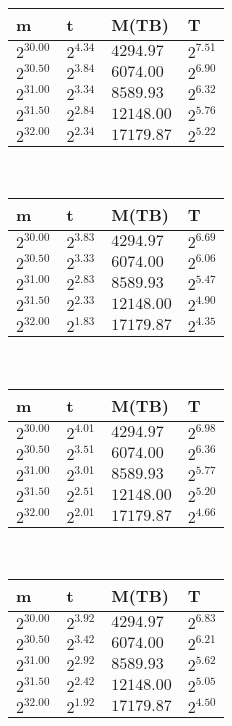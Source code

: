  \ 
\begin{tabular}{llll}
m & t & M(TB) & T \\ \hline
$2^{30.00}$ & $2^{4.34}$ & $4294.97$ & $2^{7.51}$ \\
$2^{30.50}$ & $2^{3.84}$ & $6074.00$ & $2^{6.90}$ \\
$2^{31.00}$ & $2^{3.34}$ & $8589.93$ & $2^{6.32}$ \\
$2^{31.50}$ & $2^{2.84}$ & $12148.00$ & $2^{5.76}$ \\
$2^{32.00}$ & $2^{2.34}$ & $17179.87$ & $2^{5.22}$ \\
\end{tabular}
 \ 
\begin{tabular}{llll}
m & t & M(TB) & T \\ \hline
$2^{30.00}$ & $2^{3.83}$ & $4294.97$ & $2^{6.69}$ \\
$2^{30.50}$ & $2^{3.33}$ & $6074.00$ & $2^{6.06}$ \\
$2^{31.00}$ & $2^{2.83}$ & $8589.93$ & $2^{5.47}$ \\
$2^{31.50}$ & $2^{2.33}$ & $12148.00$ & $2^{4.90}$ \\
$2^{32.00}$ & $2^{1.83}$ & $17179.87$ & $2^{4.35}$ \\
\end{tabular}
 \ 
\begin{tabular}{llll}
m & t & M(TB) & T \\ \hline
$2^{30.00}$ & $2^{4.01}$ & $4294.97$ & $2^{6.98}$ \\
$2^{30.50}$ & $2^{3.51}$ & $6074.00$ & $2^{6.36}$ \\
$2^{31.00}$ & $2^{3.01}$ & $8589.93$ & $2^{5.77}$ \\
$2^{31.50}$ & $2^{2.51}$ & $12148.00$ & $2^{5.20}$ \\
$2^{32.00}$ & $2^{2.01}$ & $17179.87$ & $2^{4.66}$ \\
\end{tabular}
 \ 
\begin{tabular}{llll}
m & t & M(TB) & T \\ \hline
$2^{30.00}$ & $2^{3.92}$ & $4294.97$ & $2^{6.83}$ \\
$2^{30.50}$ & $2^{3.42}$ & $6074.00$ & $2^{6.21}$ \\
$2^{31.00}$ & $2^{2.92}$ & $8589.93$ & $2^{5.62}$ \\
$2^{31.50}$ & $2^{2.42}$ & $12148.00$ & $2^{5.05}$ \\
$2^{32.00}$ & $2^{1.92}$ & $17179.87$ & $2^{4.50}$ \\
\end{tabular}
